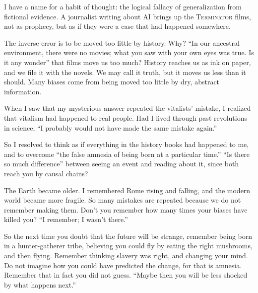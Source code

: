 
I have a name for a habit of thought: the logical fallacy of generalization from fictional evidence. A journalist writing about AI brings up the \textsc{Terminator} films, not as prophecy, but as if they were a case that had happened somewhere.

The inverse error is to be moved too little by history. Why? ``In our ancestral environment, there were no movies; what you saw with your own eyes was true. Is it any wonder'' that films move us too much?  History reaches us as ink on paper, and we file it with the novels. We may call it truth, but it moves us less than it should. Many biases come from being moved too little by dry, abstract information.

When I saw that my mysterious answer repeated the vitalists' mistake, I realized that vitalism had happened to real people. Had I lived through past revolutions in science, ``I probably would not have made the same mistake again.'' 

So I resolved to think as if everything in the history books had happened to me, and to overcome ``the false amnesia of being born at a particular time.'' ``Is there so much difference'' between seeing an event and reading about it, since both reach you by causal chains? 

The Earth became older. I remembered Rome rising and falling, and the modern world became more fragile. So many mistakes are repeated because we do not remember making them. Don't you remember how many times your biases have killed you? ``I remember; I wasn't there.''

So the next time you doubt that the future will be strange, remember being born in a hunter-gatherer tribe, believing you could fly by eating the right mushrooms, and then flying. Remember thinking slavery was right, and changing your mind. Do not imagine how you could have predicted the change, for that is amnesia. Remember that in fact you did not guess. ``Maybe then you will be less shocked by what happens next.'' 
